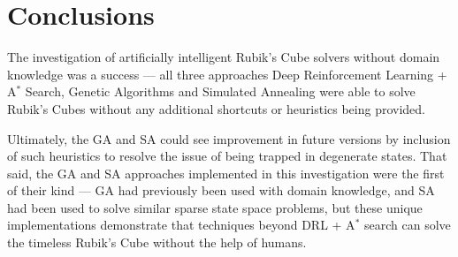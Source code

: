 \documentclass[UKenglish]{svproc}
\begin{document}
\section{Conclusions}
The investigation of artificially intelligent Rubik's Cube solvers without domain knowledge was a success --- all three approaches Deep Reinforcement Learning + A$^{\ast}$ Search, Genetic Algorithms and Simulated Annealing were able to solve Rubik's Cubes without any additional shortcuts or heuristics being provided.

Ultimately, the GA and SA could see improvement in future versions by inclusion of such heuristics to resolve the issue of being trapped in degenerate states. That said, the GA and SA approaches implemented in this investigation were the first of their kind --- GA had previously been used with domain knowledge, and SA had been used to solve similar sparse state space problems, but these unique implementations demonstrate that techniques beyond DRL + A$^{\ast}$ search can solve the timeless Rubik's Cube without the help of humans.

\printbibliography
\end{document}
